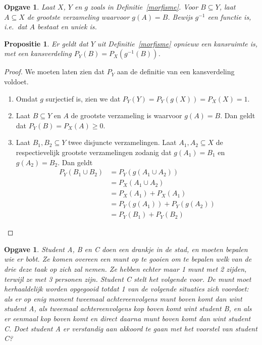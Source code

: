 \documentclass[a4paper]{book}
\newtheorem{proposition}[theorem]{Propositie}
\newtheorem{exercise}[theorem]{Opgave}
\theoremstyle{definition}
\begin{document}
\begin{exercise}\label{uniciteit_morfisme_origineel}
    Laat $X$, $Y$ en $g$ zoals in Definitie~\ref{morfisme}.
    Voor $B \subseteq Y$, laat $A \subseteq X$ de grootste verzameling waarvoor $g(A) = B$.
    Bewijs $g^{-1}$ een functie is, i.e.\ dat $A$ bestaat en uniek is.
\end{exercise}

\begin{proposition}
    Er geldt dat $Y$ uit Definitie~\ref{morfisme} opnieuw een kansruimte is, met een kansverdeling $P_Y(B) = P_X(g^{-1}(B))$.
\end{proposition}
\begin{proof}
    We moeten laten zien dat $P_Y$ aan de definitie van een kansverdeling voldoet.

    \begin{enumerate}[i]
        \item Omdat $g$ surjectief is, zien we dat $P_Y(Y) = P_Y(g(X)) = P_X(X) = 1$.
        \item Laat $B \subseteq Y$ en $A$ de grootste verzameling is waarvoor $g(A) = B$. Dan geldt dat $P_Y(B) = P_X(A) \geq 0$.
        \item Laat $B_1,B_2 \subseteq Y$ twee disjuncte verzamelingen.
            Laat $A_1,A_2 \subseteq X$ de respectievelijk grootste verzamelingen zodanig dat $g(A_1) = B_1$ en $g(A_2) = B_2$.
            Dan geldt
            \begin{align*}
                P_Y(B_1 \cup B_2) &= P_Y(g(A_1 \cup A_2)) \\
                                    &= P_X(A_1 \cup A_2) \\
                                    &= P_X(A_1) + P_X(A_1) \\
                                    &= P_Y(g(A_1)) + P_Y(g(A_2)) \\
                                    &= P_Y(B_1) + P_Y(B_2)
            \end{align*}
    \end{enumerate}
\end{proof}

\begin{exercise}
Student A, B en C doen een drankje in de stad, en moeten bepalen wie er bobt.
Ze komen overeen een munt op te gooien om te bepalen welk van de drie deze taak op zich zal nemen.
Ze hebben echter maar 1 munt met 2 zijden, terwijl ze met 3 personen zijn. Student C stelt het volgende voor. De munt moet herhaaldelijk worden opgegooid
totdat 1 van de volgende situaties zich voordoet: als er op enig moment tweemaal achtereenvolgens munt boven komt dan wint student A, als tweemaal
achtereenvolgens kop boven komt wint student B, en als er eenmaal kop boven komt en direct daarna munt boven komt dan wint student C. Doet student A er
verstandig aan akkoord te gaan met het voorstel van student C?
\end{exercise}
\end{document}
